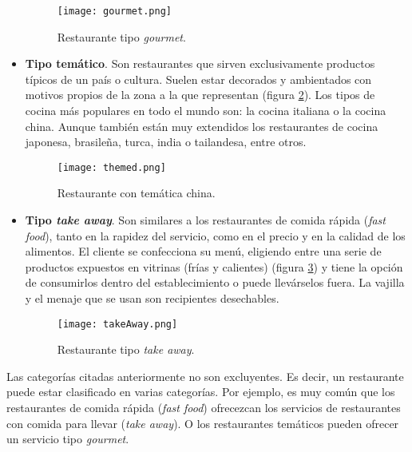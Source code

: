 \begin{itemize}
  \begin{figure}[!h]
    \begin{center}
      \texttt{[image: gourmet.png]}
      \caption{Restaurante tipo \emph{gourmet}.}
      \label{fig:gourmet}
    \end{center}
  \end{figure}

  \item \textbf{Tipo temático}. Son restaurantes que sirven exclusivamente
  productos típicos de un país o cultura. Suelen estar decorados y ambientados
  con motivos propios de la zona a la que representan (figura
  \ref{fig:themed}). Los tipos de cocina más populares en todo el mundo son: 
  la cocina italiana o la cocina china. Aunque también están muy extendidos 
  los restaurantes de cocina japonesa, brasileña, turca, india o tailandesa,
  entre otros.

  \begin{figure}[!h]
    \begin{center}
      \texttt{[image: themed.png]}
      \caption{Restaurante con temática china.}
      \label{fig:themed}
    \end{center}
  \end{figure}

  \item \textbf{Tipo \emph{take away}}. Son similares a los restaurantes de
  comida rápida (\emph{fast food}), tanto en la rapidez del servicio, como en 
  el precio y en la calidad de los alimentos. El cliente se confecciona su 
  menú, eligiendo entre una serie de productos expuestos en vitrinas (frías y 
  calientes) (figura \ref{fig:takeAway}) y tiene la opción de consumirlos 
  dentro del establecimiento o puede llevárselos fuera. La vajilla y el menaje 
  que se usan son recipientes desechables.

  \begin{figure}[!h]
    \begin{center}
      \texttt{[image: takeAway.png]}
      \caption{Restaurante tipo \emph{take away}.}
      \label{fig:takeAway}
    \end{center}
  \end{figure}

  \end{itemize}

  Las categorías citadas anteriormente no son excluyentes. Es decir, un
  restaurante puede estar clasificado en varias categorías. Por ejemplo, es muy
  común que los restaurantes de comida rápida (\emph{fast food}) ofrecezcan los
  servicios de restaurantes con comida para llevar (\emph{take away}). O los
  restaurantes temáticos pueden ofrecer un servicio tipo \emph{gourmet}.

